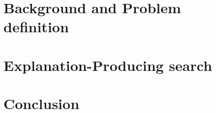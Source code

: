 \documentclass{llncs}
\begin{document}
\section{Background and Problem definition}\label{sec:background}

\section{Explanation-Producing search}\label{sec:explanation}

% 
\section{Conclusion}\label{sec:conclusiion}

%
%


\end{document}
